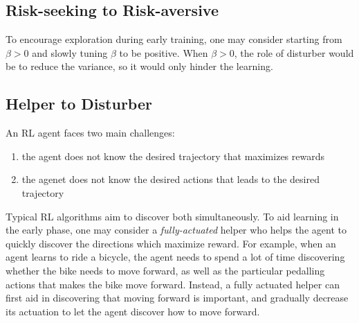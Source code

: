\documentclass{article}
\begin{document}
\subsection{Risk-seeking to Risk-aversive}

To encourage exploration during early training, one may consider starting from $\beta > 0$ and slowly tuning $\beta $ to be positive. When $\beta > 0$, the role of disturber would be to reduce the variance, so it would only hinder the learning.

\subsection{Helper to Disturber}

An RL agent faces two main challenges:
\begin{enumerate}
    \item the agent does not know the desired trajectory that maximizes rewards
    \item the agenet does not know the desired actions that leads to the desired trajectory
\end{enumerate}

Typical RL algorithms aim to discover both simultaneously.
To aid learning in the early phase, one may consider a \emph{fully-actuated} helper who helps the agent to quickly discover the directions which maximize reward. For example, when an agent learns to ride a bicycle, the agent needs to spend a lot of time discovering whether the bike needs to move forward, as well as the particular pedalling actions that makes the bike move forward. Instead, a fully actuated helper can first aid in discovering that moving forward is important, and gradually decrease its actuation to let the agent discover how to move forward.



\end{document}
